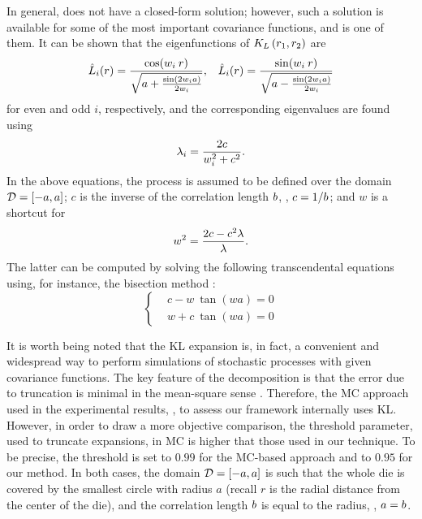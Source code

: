 In general,  does not have a closed-form solution; however, such a solution is available for some of the most important covariance functions, and  is one of them. It can be shown \cite{ghanem1991} that the eigenfunctions of $K_{L}\left(r_1, r_2\right)$ are
\begin{align*}
  & \hat{L}_i(r) = \frac{\cos(w_i \: r)}{\sqrt{a + \frac{\sin(2 w_i a)}{2 w_i}}}, & \hat{L}_i(r) = \frac{\sin(w_i \: r)}{\sqrt{a - \frac{\sin(2 w_i a)}{2 w_i}}}
\end{align*}
for even and odd $i$, respectively, and the corresponding eigenvalues are found using
\[
  \lambda_i = \frac{2 c}{w_i^2 + c^2}.
\]
In the above equations, the process is assumed to be defined over the domain $\mathcal{D} = [-a, a]$; $c$ is the inverse of the correlation length $b$, \ie, $c = 1 / b$; and $w$ is a shortcut for
\[
  w^2 = \frac{2 c - c^2 \lambda}{\lambda}.
\]
The latter can be computed by solving the following transcendental equations using, for instance, the bisection method \cite{press2007}:
\begin{equation*}
  \begin{cases}
    & c - w \: \tan (w a) = 0 \\
    & w + c \: \tan (w a) = 0
  \end{cases}
\end{equation*}

It is worth being noted that the KL expansion is, in fact, a convenient and widespread way to perform simulations of stochastic processes with given covariance functions. The key feature of the decomposition is that the error due to truncation is minimal in the mean-square sense \cite{ghanem1991}. Therefore, the MC approach used in the experimental results, , to assess our framework internally uses KL. However, in order to draw a more objective comparison, the threshold parameter, used to truncate expansions, in MC is higher that those used in our technique. To be precise, the threshold is set to $0.99$ for the MC-based approach and to $0.95$ for our method. In both cases, the domain $\mathcal{D} = [-a, a]$ is such that the whole die is covered by the smallest circle with radius $a$ (recall $r$ is the radial distance from the center of the die), and the correlation length $b$ is equal to the radius, \ie, $a = b$.
